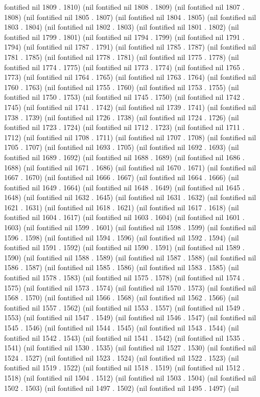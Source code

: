 fontified nil 1809 . 1810) (nil fontified nil 1808 . 1809) (nil fontified nil 1807 . 1808) (nil fontified nil 1805 . 1807) (nil fontified nil 1804 . 1805) (nil fontified nil 1803 . 1804) (nil fontified nil 1802 . 1803) (nil fontified nil 1801 . 1802) (nil fontified nil 1799 . 1801) (nil fontified nil 1794 . 1799) (nil fontified nil 1791 . 1794) (nil fontified nil 1787 . 1791) (nil fontified nil 1785 . 1787) (nil fontified nil 1781 . 1785) (nil fontified nil 1778 . 1781) (nil fontified nil 1775 . 1778) (nil fontified nil 1774 . 1775) (nil fontified nil 1773 . 1774) (nil fontified nil 1765 . 1773) (nil fontified nil 1764 . 1765) (nil fontified nil 1763 . 1764) (nil fontified nil 1760 . 1763) (nil fontified nil 1755 . 1760) (nil fontified nil 1753 . 1755) (nil fontified nil 1750 . 1753) (nil fontified nil 1745 . 1750) (nil fontified nil 1742 . 1745) (nil fontified nil 1741 . 1742) (nil fontified nil 1739 . 1741) (nil fontified nil 1738 . 1739) (nil fontified nil 1726 . 1738) (nil fontified nil 1724 . 1726) (nil fontified nil 1723 . 1724) (nil fontified nil 1712 . 1723) (nil fontified nil 1711 . 1712) (nil fontified nil 1708 . 1711) (nil fontified nil 1707 . 1708) (nil fontified nil 1705 . 1707) (nil fontified nil 1693 . 1705) (nil fontified nil 1692 . 1693) (nil fontified nil 1689 . 1692) (nil fontified nil 1688 . 1689) (nil fontified nil 1686 . 1688) (nil fontified nil 1671 . 1686) (nil fontified nil 1670 . 1671) (nil fontified nil 1667 . 1670) (nil fontified nil 1666 . 1667) (nil fontified nil 1664 . 1666) (nil fontified nil 1649 . 1664) (nil fontified nil 1648 . 1649) (nil fontified nil 1645 . 1648) (nil fontified nil 1632 . 1645) (nil fontified nil 1631 . 1632) (nil fontified nil 1621 . 1631) (nil fontified nil 1618 . 1621) (nil fontified nil 1617 . 1618) (nil fontified nil 1604 . 1617) (nil fontified nil 1603 . 1604) (nil fontified nil 1601 . 1603) (nil fontified nil 1599 . 1601) (nil fontified nil 1598 . 1599) (nil fontified nil 1596 . 1598) (nil fontified nil 1594 . 1596) (nil fontified nil 1592 . 1594) (nil fontified nil 1591 . 1592) (nil fontified nil 1590 . 1591) (nil fontified nil 1589 . 1590) (nil fontified nil 1588 . 1589) (nil fontified nil 1587 . 1588) (nil fontified nil 1586 . 1587) (nil fontified nil 1585 . 1586) (nil fontified nil 1583 . 1585) (nil fontified nil 1578 . 1583) (nil fontified nil 1575 . 1578) (nil fontified nil 1574 . 1575) (nil fontified nil 1573 . 1574) (nil fontified nil 1570 . 1573) (nil fontified nil 1568 . 1570) (nil fontified nil 1566 . 1568) (nil fontified nil 1562 . 1566) (nil fontified nil 1557 . 1562) (nil fontified nil 1553 . 1557) (nil fontified nil 1549 . 1553) (nil fontified nil 1547 . 1549) (nil fontified nil 1546 . 1547) (nil fontified nil 1545 . 1546) (nil fontified nil 1544 . 1545) (nil fontified nil 1543 . 1544) (nil fontified nil 1542 . 1543) (nil fontified nil 1541 . 1542) (nil fontified nil 1535 . 1541) (nil fontified nil 1530 . 1535) (nil fontified nil 1527 . 1530) (nil fontified nil 1524 . 1527) (nil fontified nil 1523 . 1524) (nil fontified nil 1522 . 1523) (nil fontified nil 1519 . 1522) (nil fontified nil 1518 . 1519) (nil fontified nil 1512 . 1518) (nil fontified nil 1504 . 1512) (nil fontified nil 1503 . 1504) (nil fontified nil 1502 . 1503) (nil fontified nil 1497 . 1502) (nil fontified nil 1495 . 1497) (nil 